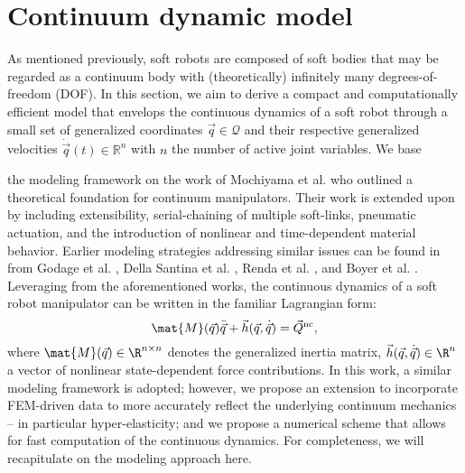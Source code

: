 \section{Continuum dynamic model}
\noindent As mentioned previously, soft robots are composed of soft bodies that may be regarded as a continuum body with (theoretically) infinitely many degrees-of-freedom (DOF). In this section, we aim to derive a compact and computationally efficient model that envelops the continuous dynamics of a soft robot through a small set of generalized coordinates $\vec{q}\in\mathcal{Q}$ and their respective generalized velocities $\dot{\vec{q}}(t)\in\mathbb{R}^n$ with $n$ the number of active joint variables. We base {the modeling framework on the work of Mochiyama et al.\cite{Mochiyama2003} who outlined a theoretical foundation for continuum manipulators. Their work is extended upon by including extensibility, serial-chaining of multiple soft-links, pneumatic actuation, and the introduction of nonlinear and time-dependent material behavior. Earlier modeling strategies addressing similar issues can be found in from Godage et al. \cite{Godage2015,Godage2016}, Della Santina et al. \cite{Santina2020,Santina2020b,Santina2020Pcc}, Renda et al. \cite{Renda2018}, and Boyer et al. \cite{Boyer2021}. Leveraging from the aforementioned works, the continuous dynamics of a soft robot manipulator can be written in the familiar Lagrangian form:
%
\begin{equation}
\mat{M}(\vec{q}) \ddot{\vec{q}} + \vec{h}(\vec{q},\dot{\vec{q}}) = \vec{Q}^{\text{nc}},
\end{equation}
%
where $\mat{M}(\vec{q}) \in \R^{n\times n}$ denotes the generalized inertia matrix, $\vec{h}(\vec{q},\dot{\vec{q}}) \in \R^{n}$ a vector of nonlinear state-dependent force contributions. In this work, a similar modeling framework is adopted; however, we propose an extension to incorporate FEM-driven data to more accurately reflect the underlying continuum mechanics -- in particular hyper-elasticity; and we propose a numerical scheme that allows for fast computation of the continuous dynamics. For completeness, we will recapitulate on the modeling approach here.
%
\begin{figure}[!t]
\hspace{4mm}
\centering
\end{figure}
%
}
